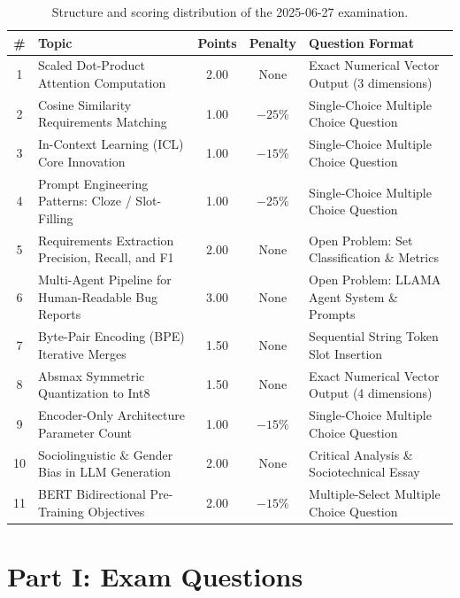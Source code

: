 \documentclass[11pt,a4paper]{article}
\begin{document}
\begin{table}[h!]
\centering
\footnotesize
\begin{tabularx}{\textwidth}{c l c c X}
\toprule
\textbf{\#} & \textbf{Topic} & \textbf{Points} & \textbf{Penalty} & \textbf{Question Format} \\
\midrule
1 & Scaled Dot-Product Attention Computation & 2.00 & None & Exact Numerical Vector Output (3 dimensions) \\
2 & Cosine Similarity Requirements Matching & 1.00 & $-25\%$ & Single-Choice Multiple Choice Question \\
3 & In-Context Learning (ICL) Core Innovation & 1.00 & $-15\%$ & Single-Choice Multiple Choice Question \\
4 & Prompt Engineering Patterns: Cloze / Slot-Filling & 1.00 & $-25\%$ & Single-Choice Multiple Choice Question \\
5 & Requirements Extraction Precision, Recall, and F1 & 2.00 & None & Open Problem: Set Classification \& Metrics \\
6 & Multi-Agent Pipeline for Human-Readable Bug Reports & 3.00 & None & Open Problem: LLAMA Agent System \& Prompts \\
7 & Byte-Pair Encoding (BPE) Iterative Merges & 1.50 & None & Sequential String Token Slot Insertion \\
8 & Absmax Symmetric Quantization to Int8 & 1.50 & None & Exact Numerical Vector Output (4 dimensions) \\
9 & Encoder-Only Architecture Parameter Count & 1.00 & $-15\%$ & Single-Choice Multiple Choice Question \\
10 & Sociolinguistic \& Gender Bias in LLM Generation & 2.00 & None & Critical Analysis \& Sociotechnical Essay \\
11 & BERT Bidirectional Pre-Training Objectives & 2.00 & $-15\%$ & Multiple-Select Multiple Choice Question \\
\bottomrule
\end{tabularx}
\caption{Structure and scoring distribution of the 2025-06-27 examination.}
\end{table}

\vspace{4pt}
\tableofcontents
\newpage

\section{Part I: Exam Questions}
\end{document}

